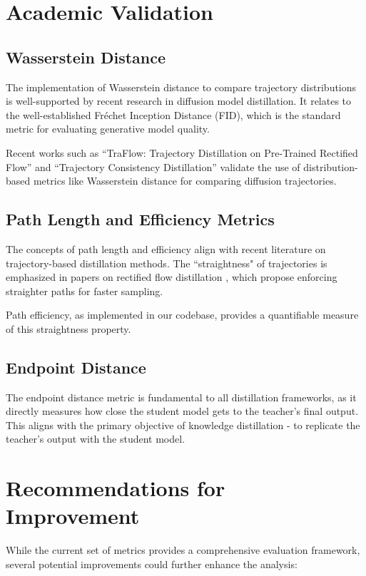 \documentclass{article}
\begin{document}
\section{Academic Validation}

\subsection{Wasserstein Distance}
The implementation of Wasserstein distance to compare trajectory distributions is well-supported by recent research in diffusion model distillation. It relates to the well-established Fréchet Inception Distance (FID), which is the standard metric for evaluating generative model quality.

Recent works such as ``TraFlow: Trajectory Distillation on Pre-Trained Rectified Flow'' \cite{wu2024traflow} and ``Trajectory Consistency Distillation'' \cite{zheng2024trajectory} validate the use of distribution-based metrics like Wasserstein distance for comparing diffusion trajectories.

\subsection{Path Length and Efficiency Metrics}
The concepts of path length and efficiency align with recent literature on trajectory-based distillation methods. The ``straightness" of trajectories is emphasized in papers on rectified flow distillation \cite{liu2023instaflow, zhu2024slimflow}, which propose enforcing straighter paths for faster sampling.

Path efficiency, as implemented in our codebase, provides a quantifiable measure of this straightness property.

\subsection{Endpoint Distance}
The endpoint distance metric is fundamental to all distillation frameworks, as it directly measures how close the student model gets to the teacher's final output. This aligns with the primary objective of knowledge distillation - to replicate the teacher's output with the student model.

\section{Recommendations for Improvement}

While the current set of metrics provides a comprehensive evaluation framework, several potential improvements could further enhance the analysis:
\end{document}
